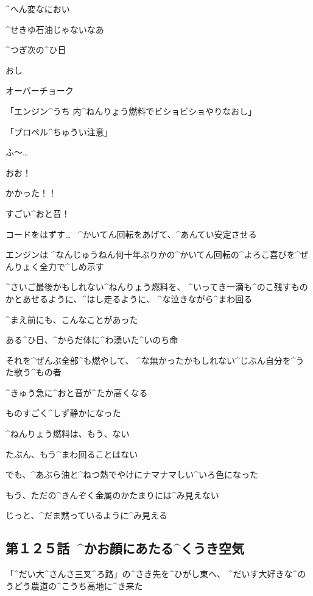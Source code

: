 \Alpha ^{へん}{変}なにおい

\Alpha ^{せきゆ}{石油}じゃないなあ

\page[57]
\Alpha ^{つぎ}{次}の^{ひ}{日}

\Alpha おし

\Alpha オーバーチョーク

\Alpha 「エンジン^{うち }{内}^{ねんりょう}{燃料}でビショビショやりなおし」

\Alpha 「プロペル^{ちゅうい}{注意}」

\Alpha ふ〜…

\page[58]
\Alpha おお！

\Alpha かかった！！

\Alpha すごい^{おと}{音}！

\Alpha コードをはずす…
\ ^{かいてん}{回転}をあげて、^{あんてい}{安定}させる

\page[60]
\Alpha エンジンは
^{なんじゅうねん}{何十年}ぶりかの^{かいてん}{回転}の^{よろこ}{喜}びを^{ぜんりょく}{全力}で^{しめ}{示}す

\Alpha ^{さいご}{最後}かもしれない^{ねんりょう}{燃料}を、
^{いってき}{一滴}も^{のこ}{残}すものかとあせるように、^{はし}{走}るように、
^{な}{泣}きながら^{まわ}{回}る

\page[61]
\Alpha ^{まえ}{前}にも、こんなことがあった

\Alpha ある^{ひ}{日}、^{からだ}{体}に^{わ}{湧}いた^{いのち}{命}

\Alpha それを^{ぜんぶ}{全部}^{も}{燃}やして、
^{な}{無}かったかもしれない^{じぶん}{自分}を^{うた}{歌}う^{もの}{者}

\page[63]
\Alpha ^{きゅう}{急}に^{おと}{音}が^{たか}{高}くなる

\page[65]
\Alpha ものすごく^{しず}{静}かになった

\Alpha ^{ねんりょう}{燃料}は、もう、ない

\Alpha たぶん、もう^{まわ}{回}ることはない

\page[66]
\Alpha でも、^{あぶら}{油}と^{ねつ}{熱}でやけにナマナマしい^{いろ}{色}になった

\Alpha もう、ただの^{きんぞく}{金属}のかたまりには^{み}{見}えない

\Alpha じっと、^{だま}{黙}っているように^{み}{見}える


\subsection{第１２５話\ ^{かお}{顔}にあたる^{くうき}{空気}}

\page[69]
\Alpha 「^{だい}{大}^{さんさ}{三叉}^{ろ}{路}」の^{さき}{先}を^{ひがし}{東}へ、
^{だいす}{大好}きな^{のうどう}{農道}の^{こうち}{高地}に^{き}{来}た


